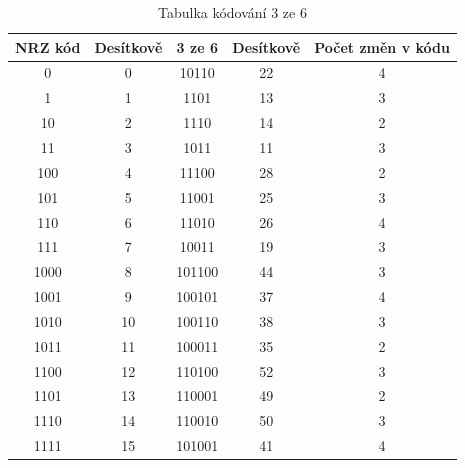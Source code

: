 \begin{table}[!ht]
\centering
\caption{Tabulka kódování 3 ze 6 \cite{WMencodeing}}
\begin{tabular}{|c|c|c|c|c|}
\hline
\textbf{NRZ kód} & \textbf{Desítkově} & \textbf{3 ze 6} & \textbf{Desítkově} & \textbf{Počet změn v kódu} \\ \hline
0                & 0                  & 10110               & 22                 & 4                          \\ \hline
1                & 1                  & 1101                & 13                 & 3                          \\ \hline
10               & 2                  & 1110                & 14                 & 2                          \\ \hline
11               & 3                  & 1011                & 11                 & 3                          \\ \hline
100              & 4                  & 11100               & 28                 & 2                          \\ \hline
101              & 5                  & 11001               & 25                 & 3                          \\ \hline
110              & 6                  & 11010               & 26                 & 4                          \\ \hline
111              & 7                  & 10011               & 19                 & 3                          \\ \hline
1000             & 8                  & 101100              & 44                 & 3                          \\ \hline
1001             & 9                  & 100101              & 37                 & 4                          \\ \hline
1010             & 10                 & 100110              & 38                 & 3                          \\ \hline
1011             & 11                 & 100011              & 35                 & 2                          \\ \hline
1100             & 12                 & 110100              & 52                 & 3                          \\ \hline
1101             & 13                 & 110001              & 49                 & 2                          \\ \hline
1110             & 14                 & 110010              & 50                 & 3                          \\ \hline
1111             & 15                 & 101001              & 41                 & 4                          \\ \hline
\end{tabular}
\end{table}

